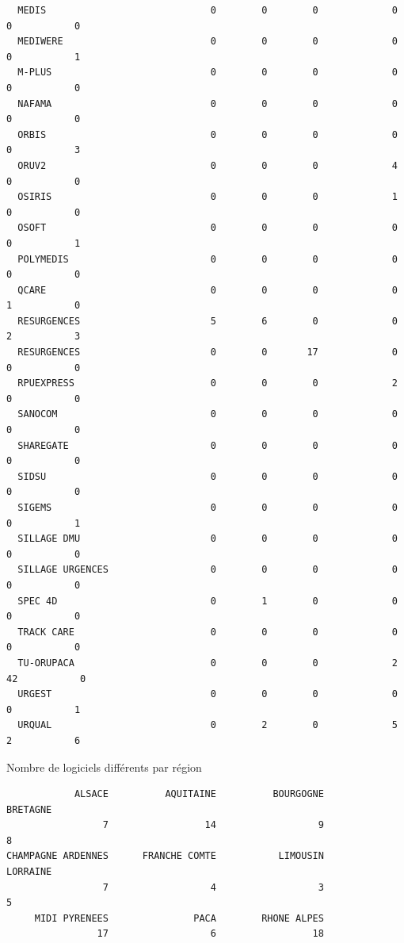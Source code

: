 \documentclass[]{article}
\begin{document}
\begin{verbatim}
  MEDIS                             0        0        0             0    0           0
  MEDIWERE                          0        0        0             0    0           1
  M-PLUS                            0        0        0             0    0           0
  NAFAMA                            0        0        0             0    0           0
  ORBIS                             0        0        0             0    0           3
  ORUV2                             0        0        0             4    0           0
  OSIRIS                            0        0        0             1    0           0
  OSOFT                             0        0        0             0    0           1
  POLYMEDIS                         0        0        0             0    0           0
  QCARE                             0        0        0             0    1           0
  RESURGENCES                       5        6        0             0    2           3
  RESURGENCES                       0        0       17             0    0           0
  RPUEXPRESS                        0        0        0             2    0           0
  SANOCOM                           0        0        0             0    0           0
  SHAREGATE                         0        0        0             0    0           0
  SIDSU                             0        0        0             0    0           0
  SIGEMS                            0        0        0             0    0           1
  SILLAGE DMU                       0        0        0             0    0           0
  SILLAGE URGENCES                  0        0        0             0    0           0
  SPEC 4D                           0        1        0             0    0           0
  TRACK CARE                        0        0        0             0    0           0
  TU-ORUPACA                        0        0        0             2   42           0
  URGEST                            0        0        0             0    0           1
  URQUAL                            0        2        0             5    2           6
\end{verbatim}

Nombre de logiciels différents par région

\begin{verbatim}
            ALSACE          AQUITAINE          BOURGOGNE           BRETAGNE 
                 7                 14                  9                  8 
CHAMPAGNE ARDENNES      FRANCHE COMTE           LIMOUSIN           LORRAINE 
                 7                  4                  3                  5 
     MIDI PYRENEES               PACA        RHONE ALPES 
                17                  6                 18 
\end{verbatim}
\end{document}
